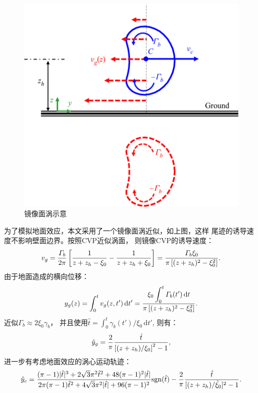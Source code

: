 \documentclass[UTF8,zihao=5]{ctexart} %
\begin{document}
\begin{figure}[H]
    \centering
    \includegraphics[width=12cm]{Fig7.png}  %
    \caption{镜像面涡示意}
\end{figure}

为了模拟地面效应，本文采用了一个镜像面涡近似，如上图，这样
尾迹的诱导速度不影响壁面边界。按照CVP近似涡面，
则镜像CVP的诱导速度：
\begin{equation} v_g=\frac{\varGamma_b}{2{\rm \pi}} \left[\frac{1}{z+z_h-\xi_0} -\frac{1}{z+z_h+\xi_0}\right] = \frac{\varGamma_b \xi_0}{{\rm \pi}\left[(z+z_h)^{2}-\xi_0^{2}\right]}. \end{equation}
由于地面造成的横向位移：
\begin{equation} y_g(z) = \int_0^{t} v_g(z,t') \,\textrm{d} t' = \frac{\xi_0 \displaystyle\int_0^{t} \varGamma_b(t') \,\textrm{d} t}{{\rm \pi} \left[(z+z_h)^{2}-\xi_0^{2}\right]}. \end{equation}
近似$\varGamma _b \approx 2\xi _0\gamma _b$，
并且使用$\hat {t} = \int _0^{t} \gamma _b(t') / \xi _0 \,\textrm {d} t'$,
则有：
\begin{equation} \hat{y}_g = \frac{2}{\rm \pi} \frac{\hat{t}}{\left[ {(z+z_h)}/{\xi_0}\right]^{2}-1}, \end{equation}
进一步有考虑地面效应的涡心运动轨迹：
\begin{equation} \hat{y}_c = \frac{({\rm \pi}-1)|\hat{t}|^{3}+2\sqrt{3}{\rm \pi}^{2}\hat{t}^{2}+48 ({\rm \pi}-1)^{2}|\hat{t}|}{2{\rm \pi}({\rm \pi}-1)\hat{t}^{2}+4\sqrt{3}{\rm \pi}^{2}|\hat{t}|+96({\rm \pi}-1)^{2}} \textrm{sgn}(\hat{t}) - \frac{2}{\rm \pi}\frac{\hat{t}}{[({z+z_h})/{\tilde{\xi}_0}]^{2}-1}. \end{equation}
\end{document}
